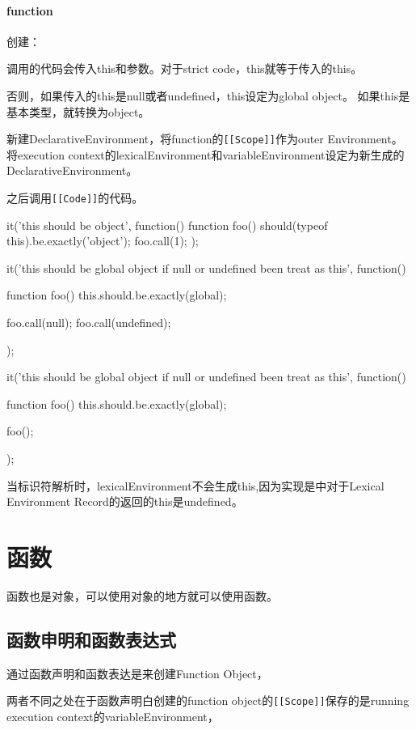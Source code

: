 \paragraph{function}
创建：

调用的代码会传入this和参数。对于strict code，this就等于传入的this。

否则，如果传入的this是null或者undefined，this设定为global object。
如果this是基本类型，就转换为object。

新建DeclarativeEnvironment，将function的\lstinline![[Scope]]!作为outer Environment。将execution context的lexicalEnvironment和variableEnvironment设定为新生成的DeclarativeEnvironment。

之后调用\lstinline![[Code]]!的代码。

\begin{JavaScript}[this是object]
		it('this should be object', function(){
			function foo(){
				should(typeof this).be.exactly('object');
			}
			foo.call(1);
		});
\end{JavaScript}

\begin{JavaScript}
		it('this should be global object if null or undefined been treat as this', function(){
			function foo(){
				this.should.be.exactly(global);
			}

			foo.call(null);
			foo.call(undefined);
		});

		it('this should be global object if null or undefined been treat as this', function(){
			function foo(){
				this.should.be.exactly(global);
			}

			foo();
		});
\end{JavaScript}

当标识符解析时，lexicalEnvironment不会生成this,因为实现是中对于Lexical Environment Record的返回的this是undefined。

\section{函数}
函数也是对象，可以使用对象的地方就可以使用函数。

\subsection{函数申明和函数表达式}	
通过函数声明和函数表达是来创建Function Object，

两者不同之处在于函数声明白创建的function object的\lstinline![[Scope]]!保存的是running execution context的variableEnvironment，

